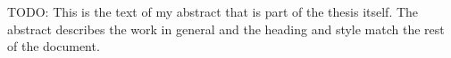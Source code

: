 TODO:
This is the text of my abstract that is part of the thesis itself.
The abstract describes the work in general and the heading and style
match the rest of the document.
